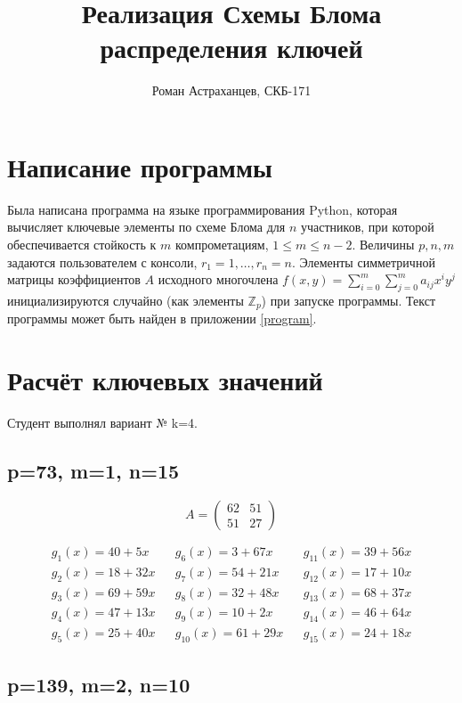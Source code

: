 \documentclass[a4paper,12pt]{article}
\title{Реализация Схемы Блома распределения ключей }
\author{Роман Астраханцев, СКБ-171}
\begin{document}
	\maketitle
	
	\section{Написание программы}
	Была написана программа на языке программирования Python, которая вычисляет ключевые элементы по схеме Блома для $n$ участников, при которой обеспечивается стойкость к $m$ компрометациям, $1\le m \le n-2$. Величины $p, n, m$ задаются пользователем с консоли, $r_1=1, \dots, r_n=n$. Элементы симметричной матрицы коэффициентов $A$ исходного многочлена $f(x,y) = \sum_{i=0}^{m} \sum_{j=0}^{m} a_{i j} x^i y^j$ инициализируются случайно (как элементы $\mathbb{Z}_p$) при запуске программы. Текст программы может быть найден в приложении \ref{program}.
	
	\section{Расчёт ключевых значений}
	
	Студент выполнял вариант № k=4.

	\subsection{p=73, m=1, n=15}
	
	\[
	A = \begin{pmatrix}
		62 & 51 \\
		51 & 27 
	\end{pmatrix}
	\]
	
	\[
	\begin{array}{ccccc}
		g_1(x) = 40 + 5 x  & & 	g_6(x) = 3 + 67 x  & & 	g_{11}(x) = 39 + 56 x \\
		g_2(x) = 18 + 32 x & & 	g_7(x) = 54 + 21 x & &	g_{12}(x) = 17 + 10 x \\
		g_3(x) = 69 + 59 x & &	g_8(x) = 32 + 48 x & &	g_{13}(x) = 68 + 37 x \\	
		g_4(x) = 47 + 13 x & &	g_9(x) = 10 + 2 x  & &	g_{14}(x) = 46 + 64 x \\
		g_5(x) = 25 + 40 x & & 	g_{10}(x) = 61 + 29 x & & 	g_{15}(x) = 24 + 18 x
	\end{array}
	\]
		
	\subsection{p=139, m=2, n=10}
	
\end{document}
